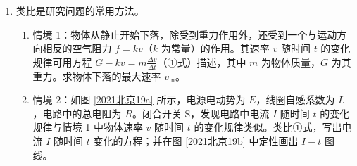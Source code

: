 \documentclass[\gkver]{gaokaozhenti}
\begin{document}
\begin{enumerate}
\begin{enumerate}
	\item
	求粒子加速器 M 的加速电压 $U$；
	\item
	求速度选择器 N 两板间的电场强度 $E$ 的大小和方向；
	\item
	仍从 S 点释放另一初速度为 0、质量为 $2m$、电荷量为 $q$ 的带正电粒子，离开 N 时粒子偏离图中虚线的距离为 $d$，求该粒子离开 N 时的动能 $E_{k}$。
\end{enumerate}


\item
类比是研究问题的常用方法。

\begin{enumerate}
	\item
	情境 1：物体从静止开始下落，除受到重力作用外，还受到一个与运动方向相反的空气阻力 $f = kv$（$k$ 为常量）的作用。其速率 $v$ 随时间 $t$ 的变化规律可用方程 $G - kv = m\frac{\Delta v}{\Delta t}$（①式）描述，其中 $m$ 为物体质量，$G$ 为其重力。求物体下落的最大速率 $v_{\mathrm{m}}$。
	\item
	情境 2：如图 \ref{2021北京19a} 所示，电源电动势为 $E$，线圈自感系数为 $L$，电路中的总电阻为 $R$。闭合开关 S，发现电路中电流 $I$ 随时间 $t$ 的变化规律与情境 1 中物体速率 $v$ 随时间 $t$ 的变化规律类似。类比①式，写出电流 $I$ 随时间 $t$ 变化的方程；并在图 \ref{2021北京19b} 中定性画出 $I-t$ 图线。



\end{enumerate}
\end{enumerate}
\end{document}
